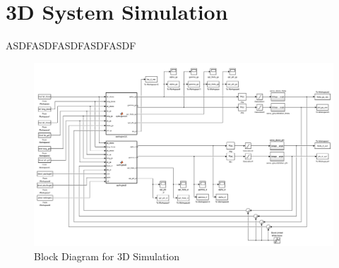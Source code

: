 \section{3D System Simulation}\label{sec:3d_sim}

ASDFASDFASDFASDFASDF

\begin{figure}
	\centering
	\includegraphics[width=\textwidth,height=\textheight,keepaspectratio]{figures/diagram_3D.png}
	\caption{Block Diagram for 3D Simulation}
   	\label{fig:diagram3D}
\end{figure}